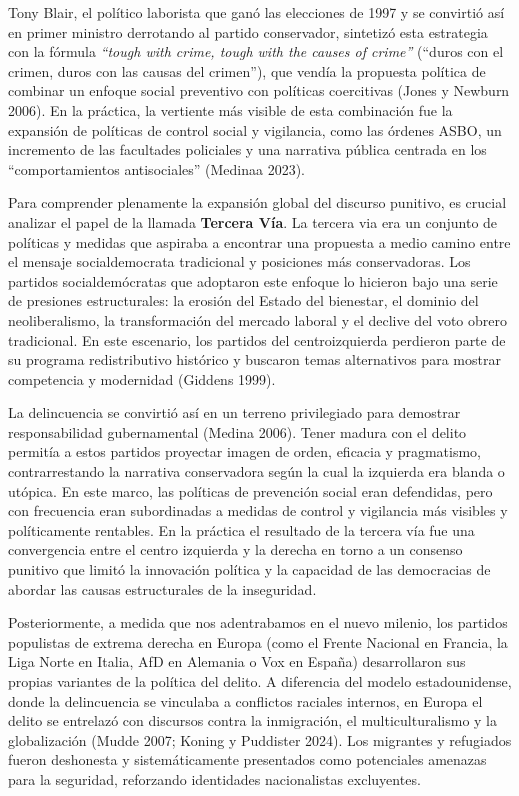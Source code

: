 \documentclass[
  spanish,
  letterpaper,
  DIV=11,
  numbers=noendperiod]{scrreprt}
\begin{document}
Tony Blair, el político laborista que ganó las elecciones de 1997 y se
convirtió así en primer ministro derrotando al partido conservador,
sintetizó esta estrategia con la fórmula \emph{``tough with crime, tough
with the causes of crime''} (``duros con el crimen, duros con las causas
del crimen''), que vendía la propuesta política de combinar un enfoque
social preventivo con políticas coercitivas (Jones y Newburn 2006). En
la práctica, la vertiente más visible de esta combinación fue la
expansión de políticas de control social y vigilancia, como las órdenes
ASBO, un incremento de las facultades policiales y una narrativa pública
centrada en los ``comportamientos antisociales'' (Medinaa 2023).

Para comprender plenamente la expansión global del discurso punitivo, es
crucial analizar el papel de la llamada \textbf{Tercera Vía}. La tercera
via era un conjunto de políticas y medidas que aspiraba a encontrar una
propuesta a medio camino entre el mensaje socialdemocrata tradicional y
posiciones más conservadoras. Los partidos socialdemócratas que
adoptaron este enfoque lo hicieron bajo una serie de presiones
estructurales: la erosión del Estado del bienestar, el dominio del
neoliberalismo, la transformación del mercado laboral y el declive del
voto obrero tradicional. En este escenario, los partidos del
centroizquierda perdieron parte de su programa redistributivo histórico
y buscaron temas alternativos para mostrar competencia y modernidad
(Giddens 1999).

La delincuencia se convirtió así en un terreno privilegiado para
demostrar responsabilidad gubernamental (Medina 2006). Tener madura con
el delito permitía a estos partidos proyectar imagen de orden, eficacia
y pragmatismo, contrarrestando la narrativa conservadora según la cual
la izquierda era blanda o utópica. En este marco, las políticas de
prevención social eran defendidas, pero con frecuencia eran subordinadas
a medidas de control y vigilancia más visibles y políticamente
rentables. En la práctica el resultado de la tercera vía fue una
convergencia entre el centro izquierda y la derecha en torno a un
consenso punitivo que limitó la innovación política y la capacidad de
las democracias de abordar las causas estructurales de la inseguridad.

Posteriormente, a medida que nos adentrabamos en el nuevo milenio, los
partidos populistas de extrema derecha en Europa (como el Frente
Nacional en Francia, la Liga Norte en Italia, AfD en Alemania o Vox en
España) desarrollaron sus propias variantes de la política del delito. A
diferencia del modelo estadounidense, donde la delincuencia se vinculaba
a conflictos raciales internos, en Europa el delito se entrelazó con
discursos contra la inmigración, el multiculturalismo y la globalización
(Mudde 2007; Koning y Puddister 2024). Los migrantes y refugiados fueron
deshonesta y sistemáticamente presentados como potenciales amenazas para
la seguridad, reforzando identidades nacionalistas excluyentes.
\end{document}
